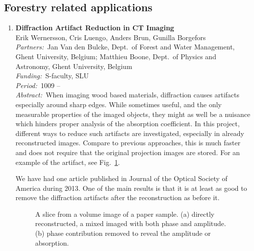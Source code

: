 \documentclass[10pt, a4paper]{article}
\newcommand{\aabstract}[1]{\emph{Abstract:~}#1}
\newcommand{\ffunding}[1]{\emph{Funding:~}#1\\}
\newcommand{\ppartners}[1]{\emph{Partners:~}#1\\}
\newcommand{\pperiod}[1]{\emph{Period:~}#1\\}
\begin{document}
\subsection{Forestry related applications}
\begin{enumerate}
\setcounter{enumi}{0}


\item
\textbf{Diffraction Artifact Reduction in \textmu CT Imaging}\\
Erik Wernersson, Cris Luengo, Anders Brun, Gunilla Borgefors \\
\ppartners{Jan Van den Bulcke, Dept.~of Forest and Water Management, Ghent University, Belgium; Matthieu Boone, Dept.~of Physics and Astronomy, Ghent University, Belgium}
\ffunding{S-faculty, SLU}
\pperiod{1009 --}
\aabstract{When imaging wood based materials, diffraction causes artifacts especially around sharp edges. While sometimes useful, and the only
measurable properties of the imaged objects, they might as well be a nuisance which hinders proper analysis of the absorption coefficient.
In this project, different ways to reduce such artifacts are investigated, especially in already reconstructed images. Compare to previous approaches, this is much faster and does not require that the original projection images are stored.  For an example of the artifact, see Fig.~\ref{fig:diffraction}.

We have had one article published in Journal of the Optical Society of America during 2013. One of the main results is that it is at least as good to remove the diffraction artifacts after the reconstruction as before it.}

\begin{figure}[!htbp]
\hfill
{}
\caption{\label{fig:diffraction} A slice from a volume image of a paper sample. (a) directly reconstructed, a mixed imaged with both phase and amplitude. (b) phase contribution removed to reveal the amplitude or absorption.}
\end{figure}


\end{enumerate}
\end{document}
